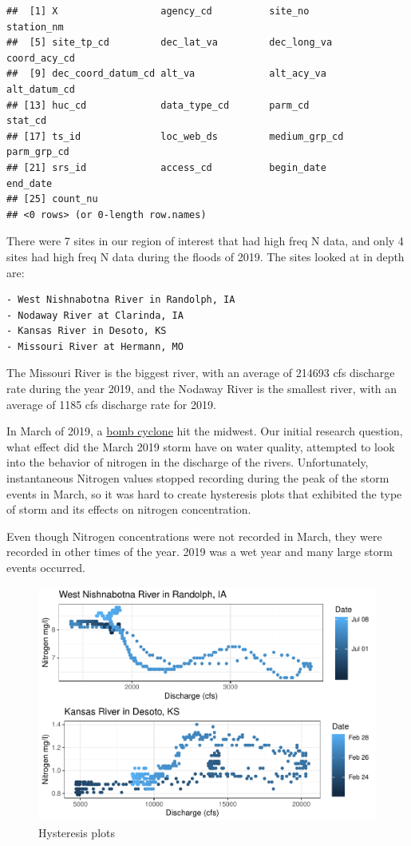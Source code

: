 \documentclass[12pt,]{article}
\begin{document}
\begin{verbatim}
##  [1] X                  agency_cd          site_no            station_nm        
##  [5] site_tp_cd         dec_lat_va         dec_long_va        coord_acy_cd      
##  [9] dec_coord_datum_cd alt_va             alt_acy_va         alt_datum_cd      
## [13] huc_cd             data_type_cd       parm_cd            stat_cd           
## [17] ts_id              loc_web_ds         medium_grp_cd      parm_grp_cd       
## [21] srs_id             access_cd          begin_date         end_date          
## [25] count_nu          
## <0 rows> (or 0-length row.names)
\end{verbatim}

There were 7 sites in our region of interest that had high freq N data,
and only 4 sites had high freq N data during the floods of 2019. The
sites looked at in depth are:

\begin{verbatim}
- West Nishnabotna River in Randolph, IA
- Nodaway River at Clarinda, IA
- Kansas River in Desoto, KS
- Missouri River at Hermann, MO
\end{verbatim}

The Missouri River is the biggest river, with an average of 214693 cfs
discharge rate during the year 2019, and the Nodaway River is the
smallest river, with an average of 1185 cfs discharge rate for 2019.

In March of 2019, a
\href{https://www.kansascity.com/news/state/missouri/article228237519.html}{bomb
cyclone} hit the midwest. Our initial research question, what effect did
the March 2019 storm have on water quality, attempted to look into the
behavior of nitrogen in the discharge of the rivers. Unfortunately,
instantaneous Nitrogen values stopped recording during the peak of the
storm events in March, so it was hard to create hysteresis plots that
exhibited the type of storm and its effects on nitrogen concentration.

Even though Nitrogen concentrations were not recorded in March, they
were recorded in other times of the year. 2019 was a wet year and many
large storm events occurred.

\begin{figure}
\centering
\includegraphics{Project_Template_files/figure-latex/desotos-1.pdf}
\caption{\label{fig:desotos} Hysteresis plots}
\end{figure}
\end{document}
